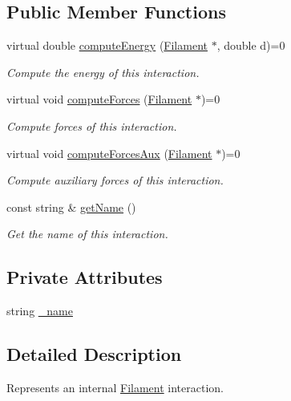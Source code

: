 \subsection*{Public Member Functions}
\begin{DoxyCompactItemize}
\item 
virtual double \hyperlink{classFilamentInteractions_ac67b5179bc0e843307edc1eb3d84722c}{compute\+Energy} (\hyperlink{classFilament}{Filament} $\ast$, double d)=0
\begin{DoxyCompactList}\small\item\em Compute the energy of this interaction. \end{DoxyCompactList}\item 
virtual void \hyperlink{classFilamentInteractions_aa6747042a647d8d9d53cb437afc06f8b}{compute\+Forces} (\hyperlink{classFilament}{Filament} $\ast$)=0
\begin{DoxyCompactList}\small\item\em Compute forces of this interaction. \end{DoxyCompactList}\item 
virtual void \hyperlink{classFilamentInteractions_a77233ea2da56eaffe0bdea79c310d818}{compute\+Forces\+Aux} (\hyperlink{classFilament}{Filament} $\ast$)=0
\begin{DoxyCompactList}\small\item\em Compute auxiliary forces of this interaction. \end{DoxyCompactList}\item 
const string \& \hyperlink{classFilamentInteractions_af3c391f24ffbb7088de189cdb209d650}{get\+Name} ()
\begin{DoxyCompactList}\small\item\em Get the name of this interaction. \end{DoxyCompactList}\end{DoxyCompactItemize}
\subsection*{Private Attributes}
\begin{DoxyCompactItemize}
\item 
string \hyperlink{classFilamentInteractions_a5b2e160dc98547ff6613a989100083b5}{\+\_\+name}
\end{DoxyCompactItemize}


\subsection{Detailed Description}
Represents an internal \hyperlink{classFilament}{Filament} interaction. 

